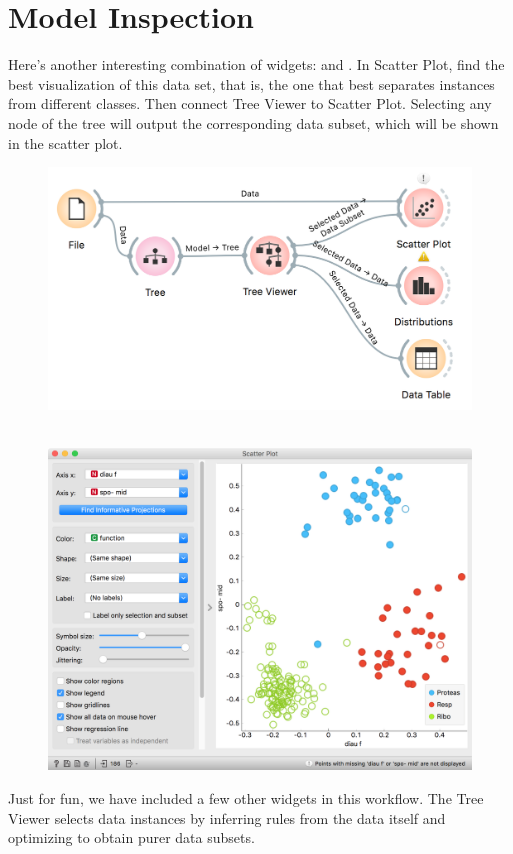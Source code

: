 \chapter{Model Inspection}
\label{ch:model-inspection}

Here's another interesting combination of widgets:  and . In Scatter Plot, find the best visualization of this data set, that is, the one that best separates instances from different classes. Then connect Tree Viewer to Scatter Plot. Selecting any node of the tree will output the corresponding data subset, which will be shown in the scatter plot.

\begin{figure}[h]
    \centering
    \includegraphics[width=\linewidth]{workflow.png}
    \caption{$\;$}
\end{figure}

\begin{figure}
    \includegraphics[scale=0.35]{brown-scatterplot.png}
    \label{fig:scatterplot}
\end{figure}

Just for fun, we have included a few other widgets in this workflow. The Tree Viewer selects data instances by inferring rules from the data itself and optimizing to obtain purer data subsets.
